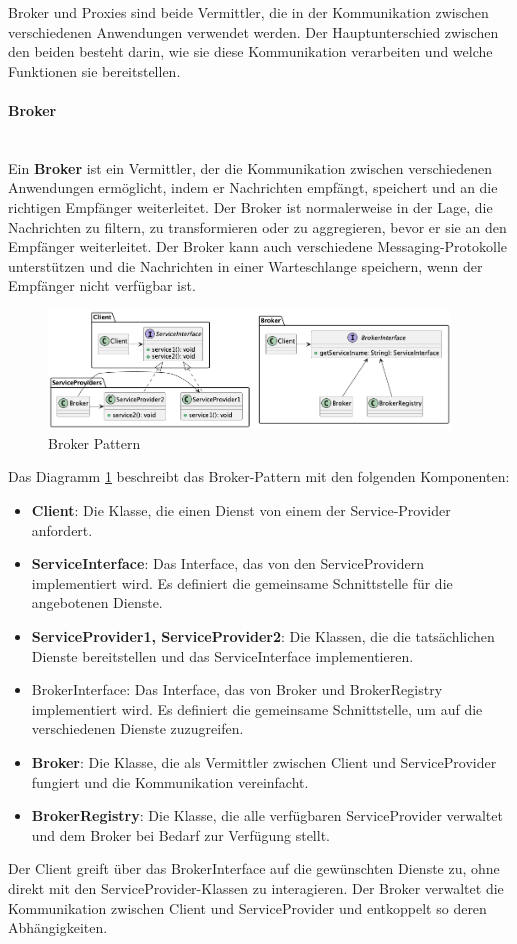 \documentclass[../vs-script-first-v01.tex]{subfiles}
\begin{document}
Broker und Proxies sind beide Vermittler, die in der Kommunikation zwischen verschiedenen Anwendungen verwendet werden. Der Hauptunterschied zwischen den beiden besteht darin, wie sie diese Kommunikation verarbeiten und welche Funktionen sie bereitstellen.
\paragraph{Broker\\\\}
Ein \textbf{Broker} ist ein Vermittler, der die Kommunikation zwischen verschiedenen Anwendungen ermöglicht, indem er Nachrichten empfängt, speichert und an die richtigen Empfänger weiterleitet. Der Broker ist normalerweise in der Lage, die Nachrichten zu filtern, zu transformieren oder zu aggregieren, bevor er sie an den Empfänger weiterleitet. Der Broker kann auch verschiedene Messaging-Protokolle unterstützen und die Nachrichten in einer Warteschlange speichern, wenn der Empfänger nicht verfügbar ist. 

\begin{figure}[ht]
  \centering
  \includegraphics[width=0.95\textwidth]{fig/uml/broker.png}
  \caption{Broker Pattern}
  \label{fig:broker}
\end{figure}

Das Diagramm \ref{fig:broker} beschreibt das Broker-Pattern mit den folgenden Komponenten:
\begin{itemize}
\item \textbf{Client}: Die Klasse, die einen Dienst von einem der Service-Provider anfordert.
\item \textbf{ServiceInterface}: Das Interface, das von den ServiceProvidern implementiert wird. Es definiert die gemeinsame Schnittstelle für die angebotenen Dienste.
\item \textbf{ServiceProvider1, ServiceProvider2}: Die Klassen, die die tatsächlichen Dienste bereitstellen und das ServiceInterface implementieren.
\item BrokerInterface: Das Interface, das von Broker und BrokerRegistry implementiert wird. Es definiert die gemeinsame Schnittstelle, um auf die verschiedenen Dienste zuzugreifen.
\item \textbf{Broker}: Die Klasse, die als Vermittler zwischen Client und ServiceProvider fungiert und die Kommunikation vereinfacht.
\item \textbf{BrokerRegistry}: Die Klasse, die alle verfügbaren ServiceProvider verwaltet und dem Broker bei Bedarf zur Verfügung stellt.
\end{itemize}
Der Client greift über das BrokerInterface auf die gewünschten Dienste zu, ohne direkt mit den ServiceProvider-Klassen zu interagieren. Der Broker verwaltet die Kommunikation zwischen Client und ServiceProvider und entkoppelt so deren Abhängigkeiten.
\end{document}
